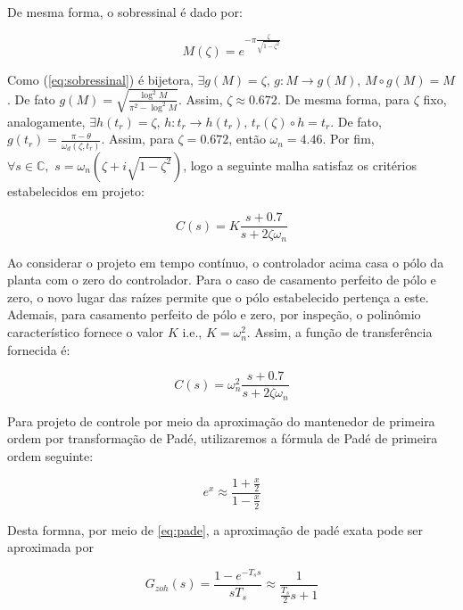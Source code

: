 \documentclass[twoside, fleqn]{article}
\begin{document}
    De mesma forma, o sobressinal é dado por:
    
        \begin{equation}
            M(\zeta) = e^{-\pi \frac{\zeta}{\sqrt{1-\zeta^2}}}
            \label{eq:sobressinal}
        \end{equation}
    
    Como (\ref{eq:sobressinal}) é bijetora, $\exists g(M) = \zeta \mbox{, } g: M \rightarrow g(M) \mbox{, } M \circ g (M) = M$. De fato $g(M) = \sqrt{\frac{\log^2{M}}{\pi^2 - \log^2{M}}}$. Assim, $\zeta \approx 0.672$. De mesma forma, para $\zeta$ fixo, analogamente, $\exists h(t_r) = \zeta\mbox{, }h: t_r \rightarrow h(t_r)\mbox{, } t_r(\zeta) \circ h = t_r$. De fato, $g(t_r) = \frac{\pi - \theta}{\omega_d(\zeta, t_r)}$. Assim, para $\zeta = 0.672$, então $\omega_n = 4.46$.
    Por fim, $\forall s \in \mathbb{C}, \,\, s = \omega_n (\zeta + i \sqrt{1 - \zeta^2})$, logo a seguinte malha satisfaz os critérios estabelecidos em projeto:
    
        \begin{equation}
            C(s) = K \frac{s + 0.7}{s + 2 \zeta \omega_n}
        \end{equation}
    
    Ao considerar o projeto em tempo contínuo, o controlador acima casa o pólo da planta com o zero do controlador. Para o caso de casamento perfeito de pólo e zero, o novo lugar das raízes permite que o pólo estabelecido pertença a este. Ademais, para casamento perfeito de pólo e zero, por inspeção, o polinômio característico fornece o valor $K$ i.e., $K = \omega_n^2$. Assim, a função de transferência fornecida é:
    
        \begin{equation}
            C(s) = \omega_n^2 \frac{s + 0.7}{s + 2 \zeta \omega_n}
        \end{equation}
        
    Para projeto de controle por meio da aproximação do mantenedor de primeira ordem por transformação de Padé, utilizaremos a fórmula de Padé de primeira ordem seguinte:
    
    \begin{equation}
    e^{x} \approx \frac{1 + \frac{x}{2}}{1 - \frac{x}{2}}
    \label{eq:pade}
    \end{equation}
    
    Desta formna, por meio de \eqref{eq:pade}, a aproximação de padé exata pode ser aproximada por
    
    \begin{equation}
    G_{zoh}(s) = \frac{1 - e^{-T_s s}}{s T_s} \approx \frac{1}{\frac{T_s}{2} s + 1}
    \end{equation}
    
\end{document}
